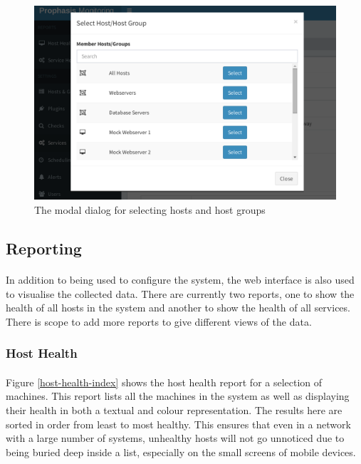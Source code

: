 \documentclass[bsc,logo,twoside,singlespacing]{infthesis}
\begin{document}
\begin{figure}[H]
	\centering
	\caption{The modal dialog for selecting hosts and host groups}
	\label{edit-service-modal}
	\includegraphics[scale=0.44]{assets/screenshots/edit-service-modal.pdf}
\end{figure}

\subsection{Reporting}
\paragraph*{}
	In addition to being used to configure the system, the web interface is also
	used to visualise the collected data.  There are currently two reports, one
	to show the health of all hosts in the system and another to show the health
	of all services.  There is scope to add more reports to give different views
	of the data.  
\subsubsection{Host Health}
\paragraph*{}
	Figure \ref{host-health-index} shows the host health report for
	a selection of machines.  This report lists all the machines in the system
	as well as displaying their health in both a textual and colour representation.
	The results here are sorted in order from least to most healthy.  This ensures
	that even in a network with a large number of systems, unhealthy hosts will not
	go unnoticed due to being buried deep inside a list, especially on the small
	screens of mobile devices.
	
\end{document}
